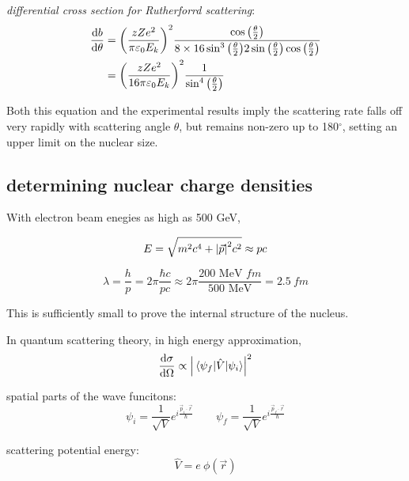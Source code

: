 \documentclass[10pt, a4paper, twocolumn]{article}
\newcommand{\deff}[1]{\par \noindent \textit{#1}: }
\newcommand{\eps}{\ensuremath{\varepsilon _0}}
\begin{document}
\deff{differential cross section for Rutherforrd scattering}
\begin{equation*}
\begin{aligned}
\dv{b}{\theta}&=\qty(\frac{zZe^2}{\pi \eps E_k})^2
\frac{\cos\qty(\frac{\theta}{2})}
{8\times 16\sin ^3\qty(\frac{\theta}{2})
2\sin\qty(\frac{\theta}{2})
\cos\qty(\frac{\theta}{2})}
\\&= \qty(\frac{zZe^2}{16\pi\eps E_k})^2
\frac{1}{\sin ^4 \qty(\frac{\theta}{2})}
\end{aligned}
\end{equation*}

Both this equation and the experimental results imply the scattering rate falls off very rapidly with scattering angle $\theta$, but remains non-zero up to 180$^\circ$, setting an upper limit on the nuclear size.

\subsection{determining nuclear charge densities}

With electron beam enegies as high as 500 GeV, 

\[E = \sqrt{m^2c^4+\abs{\vec p}^2c^2} \approx pc\]

\[\lambda = \frac{h}{p} = 2\pi\frac{\hbar c}{pc}
\approx 2\pi \frac{\text{200 MeV }fm}{\text{500 MeV}}
=2.5\ fm \]

This is sufficiently small to prove the internal structure of the nucleus.

In quantum scattering theory, in high energy approximation,
\[\dv{\sigma}{\Omega} \propto
\abs{\mel{\psi _f}{\hat V}{\psi _i}}^2 \]

spatial parts of the wave funcitons:
\[\psi _i=\frac{1}{\sqrt V}
e^{i\frac{\vec p _i \cdot \vec r}{\hbar}}
\qquad \psi _f=\frac{1}{\sqrt V}
e^{i\frac{\vec p _f \cdot \vec r}{\hbar}} \]

scattering potential energy:
\[\hat V =e\ \phi (\vec r)\]
\end{document}
